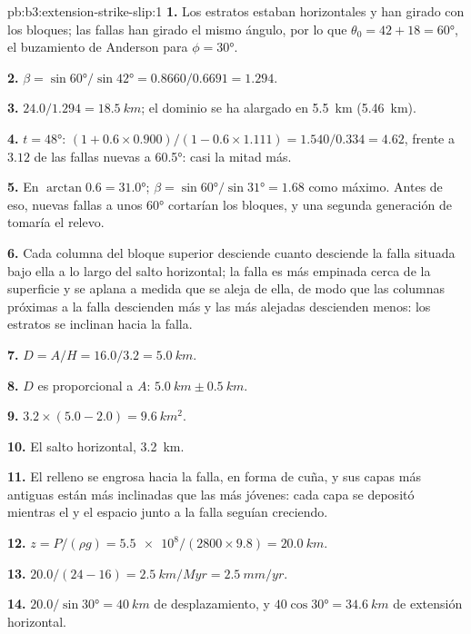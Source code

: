 \begin{solution}{pb:b3:extension-strike-slip:1}
\textbf{1.} Los estratos estaban horizontales y han girado con los bloques; las
fallas han girado el mismo ángulo, por lo que $\theta_0 = 42 + 18 = \ang{60}$,
el buzamiento de Anderson para $\phi = \ang{30}$.

\textbf{2.} $\beta = \sin\ang{60}/\sin\ang{42} = 0.8660/0.6691 = 1.294$.

\textbf{3.} $24.0/1.294 = \qty{18.5}{km}$; el dominio se ha alargado en
\qty{5.5}{km} (\qty{5.46}{km}).

\textbf{4.} $t = \ang{48}$: $(1 + 0.6\times0.900)/(1 - 0.6\times1.111) =
1.540/0.334 = 4.62$, frente a $3.12$ de las fallas nuevas a \ang{60.5}: casi
la mitad más.

\textbf{5.} En $\arctan0.6 = \ang{31.0}$; $\beta = \sin\ang{60}/\sin\ang{31}
= 1.68$ como máximo. Antes de eso, nuevas fallas a unos \ang{60} cortarían los
bloques, y una segunda generación de  tomaría el relevo.

\textbf{6.} Cada columna del bloque superior desciende cuanto desciende la falla situada
bajo ella a lo largo del salto horizontal; la falla es más empinada cerca de la superficie y se aplana
a medida que se aleja de ella, de modo que las columnas próximas a la falla descienden más y las más alejadas
descienden menos: los estratos se inclinan hacia la falla.

\textbf{7.} $D = A/H = 16.0/3.2 = \qty{5.0}{km}$.

\textbf{8.} $D$ es proporcional a $A$: $\qty{5.0}{km} \pm \qty{0.5}{km}$.

\textbf{9.} $3.2\times(5.0 - 2.0) = \qty{9.6}{km^2}$.

\textbf{10.} El salto horizontal, \qty{3.2}{km}.

\textbf{11.} El relleno se engrosa hacia la falla, en forma de cuña, y sus capas más antiguas
están más inclinadas que las más jóvenes: cada capa se depositó mientras
el  y el espacio junto a la falla seguían creciendo.

\textbf{12.} $z = P/(\rho g) = \num{5.5e8}/(2800\times9.8) = \qty{20.0}{km}$.

\textbf{13.} $20.0/(24 - 16) = \qty{2.5}{km/Myr} = \qty{2.5}{mm/yr}$.

\textbf{14.} $20.0/\sin\ang{30} = \qty{40}{km}$ de desplazamiento, y $40\cos\ang{30} =
\qty{34.6}{km}$ de extensión horizontal.


\end{solution}
